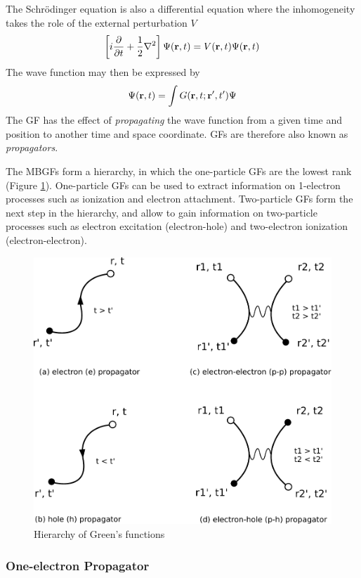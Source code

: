 The Schrödinger equation is also a differential equation where the inhomogeneity takes the role of the external perturbation $V$
\begin{equation}
\left[ i\frac{\partial}{\partial t} + \frac{1}{2} \nabla^2 \right] \Psi(\mathbf{r},t) = V(\mathbf{r},t) \Psi(\mathbf{r},t)
\end{equation}
\noindent The wave function may then be expressed by
\begin{equation}
\Psi(\mathbf{r},t) = \int G(\mathbf{r},t;\mathbf{r}',t') \Psi
\end{equation}
\noindent The GF has the effect of \emph{propagating} the wave function from a given time and position to another time and space coordinate. GFs are therefore also known as \emph{propagators}.

The MBGFs form a hierarchy, in which the one-particle GFs are the lowest rank (Figure \ref{fig:PROP}). One-particle GFs can be used to extract information on 1-electron processes such as ionization and electron attachment. Two-particle GFs form the next step in the hierarchy, and allow to gain information on two-particle processes such as electron excitation (electron-hole) and two-electron ionization (electron-electron). 
\begin{figure}
\centering
\includegraphics[scale=0.6]{Pics/PROP}
\caption{Hierarchy of Green's functions}
\label{fig:PROP}
\end{figure}

\subsubsection{One-electron Propagator}

